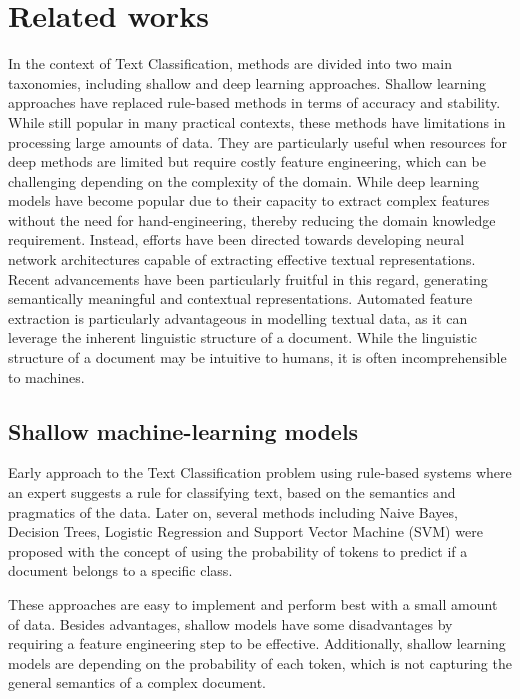 \documentclass[sn-mathphys,Numbered]{sn-jnl}%
\theoremstyle{thmstyleone}%
\theoremstyle{thmstyletwo}%
\theoremstyle{thmstylethree}%
\begin{document}
\section{Related works}\label{relatedworks}
In the context of Text Classification, methods are divided into two main taxonomies, including shallow and deep learning approaches. Shallow learning approaches have replaced rule-based methods in terms of accuracy and stability. While still popular in many practical contexts, these methods have limitations in processing large amounts of data. They are particularly useful when resources for deep methods are limited but require costly feature engineering, which can be challenging depending on the complexity of the domain. While deep learning models have become popular due to their capacity to extract complex features without the need for hand-engineering, thereby reducing the domain knowledge requirement. Instead, efforts have been directed towards developing neural network architectures capable of extracting effective textual representations. Recent advancements have been particularly fruitful in this regard, generating semantically meaningful and contextual representations. Automated feature extraction is particularly advantageous in modelling textual data, as it can leverage the inherent linguistic structure of a document. While the linguistic structure of a document may be intuitive to humans, it is often incomprehensible to machines.

\subsection{Shallow machine-learning models}

Early approach to the Text Classification problem using rule-based systems where an expert suggests a rule for classifying text, based on the semantics and pragmatics of the data. Later on, several methods including Naive Bayes\cite{Xu2017}, Decision Trees\cite{Safavian1991}, Logistic Regression\cite{Genkin2007} and Support Vector Machine (SVM)\cite{boser1992, cortesvapnik1995} were proposed with the concept of using the probability of tokens to predict if a document belongs to a specific class. 

These approaches are easy to implement and perform best with a small amount of data. Besides advantages, shallow models have some disadvantages by requiring a feature engineering step to be effective. Additionally, shallow learning models are depending on the probability of each token, which is not capturing the general semantics of a complex document.
\end{document}
